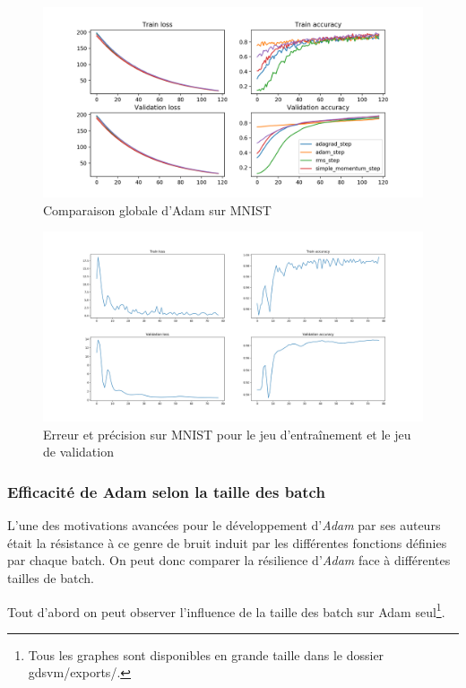 \documentclass[fleqn,11pt, titlepage, french]{article}
\begin{document}
	\begin{figure}[H]
		\centering
		\includegraphics[width=1\linewidth]{../gdsvm/exports/mnist-comparison}
		\caption{Comparaison globale d'Adam sur MNIST}
		\label{fig:mnist-comparison}
	\end{figure}
	
	
		\begin{figure}[H]
		\centering
		\includegraphics[scale=0.35]{../gdsvm/exports/adam_train.png}
		\caption{Erreur et précision sur MNIST pour le jeu d'entraînement et le jeu de validation}
	\end{figure}
	
	
	\subsubsection{Efficacité de Adam selon la taille des batch}
	
	L'une des motivations avancées pour le développement d'\emph{Adam} par ses auteurs était la résistance à ce genre de bruit induit par les différentes fonctions définies par chaque batch. On peut donc comparer la résilience d'\emph{Adam} face à différentes tailles de batch.
	
	Tout d'abord on peut observer l'influence de la taille des batch sur Adam seul\footnote{Tous les graphes sont disponibles en grande taille dans le dossier gdsvm/exports/.}.
	
\end{document}
